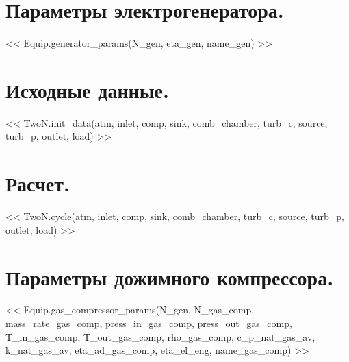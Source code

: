 \documentclass[a4paper,10pt]{article}
\begin{document}
    \section{Параметры электрогенератора.}

    << Equip.generator_params(N_gen, eta_gen, name_gen) >>

    \section{Исходные данные.}

    << TwoN.init_data(atm, inlet, comp, sink, comb_chamber, turb_c, source, turb_p, outlet, load) >>

    \section{Расчет.}

    << TwoN.cycle(atm, inlet, comp, sink, comb_chamber, turb_c, source, turb_p, outlet, load) >>

    \section{Параметры дожимного компрессора.}

    << Equip.gas_compressor_params(N_gen, N_gas_comp, mass_rate_gas_comp, press_in_gas_comp, press_out_gas_comp, T_in_gas_comp, T_out_gas_comp, rho_gas_comp, c_p_nat_gas_av, k_nat_gas_av, eta_ad_gas_comp, eta_el_eng, name_gas_comp) >>
\end{document}
